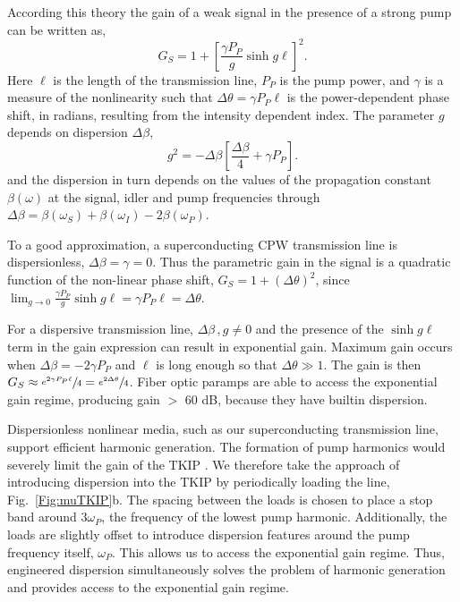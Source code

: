 According this theory \cite{Stolen1982} the gain of a weak signal in the presence of a strong pump can be written as,
\begin{equation}
	G_S = 1+ \left[ \frac{\gamma P_P}{g} \sinh g \ell \right]^2.
\end{equation}
Here $\ell$ is the length of the transmission line, $P_P$ is the pump power, and $\gamma$ is a measure of the nonlinearity such that $\Delta \theta = \gamma P_P \ell$ is the power-dependent phase shift, in radians, resulting from the intensity dependent index. The parameter $g$ depends on dispersion $\Delta \beta$,
\begin{equation}
	g^2 = - \Delta \beta \left[ \frac{\Delta \beta}{4} + \gamma P_P\right].
\end{equation}
and the dispersion in turn depends on the values of the propagation constant $\beta(\omega)$ at the signal, idler and pump frequencies through $\Delta \beta = \beta(\omega_S) + \beta(\omega_I) -2\beta(\omega_P)$.


To a good approximation, a superconducting CPW transmission line is dispersionless, $\Delta \beta = \gamma = 0$. Thus the parametric gain in the signal is a quadratic function of the non-linear phase shift, $G_S = 1 + (\Delta \theta)^2$, since  $ \lim_{g \to 0} \frac{\gamma P_P}{g} \sinh g \ell =  \gamma P_P \ell = \Delta \theta$.

  
For a dispersive transmission line, $\Delta \beta \, , g \neq 0 $ and the presence of the $\sinh  g \ell$ term in the gain
expression can result in exponential gain. Maximum gain occurs when $\Delta \beta = -2 \gamma P_P$ and $\ell$  is long enough so that $\Delta \theta \gg 1$. The gain is then $G_S \approx \sfrac{e^{2\gamma P_P \ell}}{4} = \sfrac{e^{2\Delta \theta}}{4}$. Fiber optic paramps are able to access the exponential gain regime, producing gain $>$ 60 dB, because they have builtin dispersion.  

Dispersionless nonlinear media, such as our superconducting transmission line, support efficient harmonic generation. The formation of pump harmonics would severely limit the gain of the TKIP \cite{Landauer1960}. We therefore take the approach of introducing  dispersion into  the TKIP by periodically loading the line, Fig.~\ref{Fig:muTKIP}b. The spacing between the loads is chosen to place a stop band around $3\omega_P$, the frequency of the lowest pump harmonic. Additionally, the loads are slightly offset to introduce dispersion features around the pump frequency itself, $\omega_P$. This allows us to access the exponential gain regime. Thus, engineered dispersion simultaneously solves the problem of harmonic generation and provides access to the exponential gain regime.   


